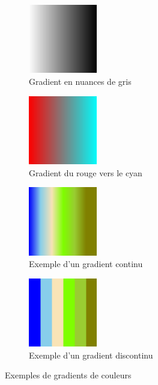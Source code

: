 \documentclass[11pt]{article}
\begin{document}
\begin{figure}[H]
    \centering
    \begin{subfigure}{0.2\textwidth}
    \centering
            \includegraphics[width=3cm]{Images/greys.png}
        \caption{Gradient en nuances de gris}
        \label{fig:greys}
    \end{subfigure}
    \begin{subfigure}{0.2\textwidth}
    \centering
        \includegraphics[width=3cm]{Images/mushroom.png}
        \caption{Gradient du rouge vers le cyan}
        \label{fig:mushroom}
    \end{subfigure}
    \begin{subfigure}{0.2\textwidth}
    \centering
        \includegraphics[width=3cm]{Images/island_discont.png}
        \caption{Exemple d'un gradient continu}
        \label{fig:gradient_continu}
    \end{subfigure}
    \begin{subfigure}{0.2\textwidth}
    \centering
        \includegraphics[width=3cm]{Images/island_continu.png}
        \caption{Exemple d'un gradient discontinu}
        \label{fig:gradient_discontinu}
    \end{subfigure}
    \caption{Exemples de gradients de couleurs}
    \label{fig:colormap}
\end{figure}
\end{document}
